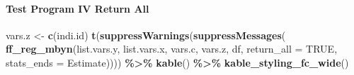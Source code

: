 \documentclass[
]{book}
\newenvironment{Shaded}{\begin{snugshade}}{\end{snugshade}}
\newcommand{\DataTypeTok}[1]{\textcolor[rgb]{0.13,0.29,0.53}{#1}}
\newcommand{\KeywordTok}[1]{\textcolor[rgb]{0.13,0.29,0.53}{\textbf{#1}}}
\newcommand{\NormalTok}[1]{#1}
\newcommand{\OperatorTok}[1]{\textcolor[rgb]{0.81,0.36,0.00}{\textbf{#1}}}
\newcommand{\OtherTok}[1]{\textcolor[rgb]{0.56,0.35,0.01}{#1}}
\newcommand{\StringTok}[1]{\textcolor[rgb]{0.31,0.60,0.02}{#1}}
\begin{document}
\hypertarget{test-program-iv-return-all}{%
\paragraph{Test Program IV Return All}\label{test-program-iv-return-all}}

\begin{Shaded}
\begin{Highlighting}[]
\NormalTok{vars.z \textless{}{-}}\StringTok{ }\KeywordTok{c}\NormalTok{(}\StringTok{\textquotesingle{}indi.id\textquotesingle{}}\NormalTok{)}
\KeywordTok{t}\NormalTok{(}\KeywordTok{suppressWarnings}\NormalTok{(}\KeywordTok{suppressMessages}\NormalTok{(}
  \KeywordTok{ff\_reg\_mbyn}\NormalTok{(list.vars.y, list.vars.x,}
\NormalTok{            vars.c, vars.z, df,}
            \DataTypeTok{return\_all =} \OtherTok{TRUE}\NormalTok{,}
            \DataTypeTok{stats\_ends =} \StringTok{\textquotesingle{}Estimate\textquotesingle{}}\NormalTok{)))) }\OperatorTok{\%\textgreater{}\%}
\StringTok{  }\KeywordTok{kable}\NormalTok{() }\OperatorTok{\%\textgreater{}\%}
\StringTok{  }\KeywordTok{kable\_styling\_fc\_wide}\NormalTok{()}
\end{Highlighting}
\end{Shaded}
\end{document}
